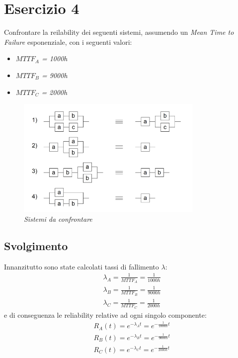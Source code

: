 \section{Esercizio 4}
Confrontare la reilability dei seguenti sistemi, assumendo un \textit{Mean Time to Failure} esponenziale, con i seguenti valori:
\begin{itemize}
	\item \textit{$MTTF_A$ = 1000h}
	\item \textit{$MTTF_B$ = 9000h}
	\item \textit{$MTTF_C$ = 2000h}
\end{itemize}
\begin{figure}[H]
	\centering
	\includegraphics[width=0.8\textwidth]{img/hw5/es4_traccia.png}
	\caption{\textit{Sistemi da confrontare}}
\end{figure}
\subsection{Svolgimento}
Innanzitutto sono state calcolati tassi di fallimento $\lambda$:
\begin{equation*}
	\begin{split}
		&\lambda_A = \frac{1}{MTTF_A} = \frac{1}{1000h}\\
		&\lambda_B = \frac{1}{MTTF_B} = \frac{1}{9000h}\\
		&\lambda_C = \frac{1}{MTTF_C} = \frac{1}{2000h}
	\end{split}
\end{equation*}
e di conseguenza le reliability relative ad ogni singolo componente:
\begin{equation*}
	\begin{split}
		&R_A(t) = e^{-\lambda_A t} = e^{-\frac{1}{1000h} t}\\
		&R_B(t) = e^{-\lambda_B t} = e^{-\frac{1}{9000h} t}\\
		&R_C(t) = e^{-\lambda_C t} = e^{-\frac{1}{2000h} t}
	\end{split}
\end{equation*}
